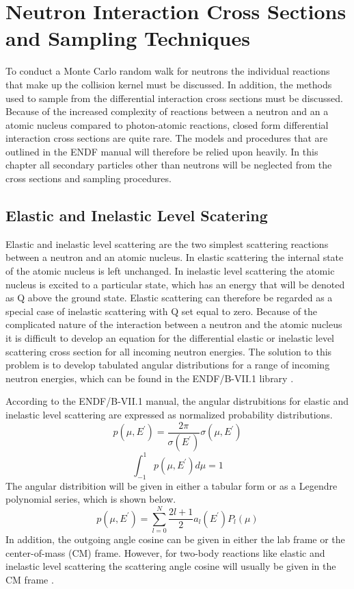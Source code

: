 \chapter{Neutron Interaction Cross Sections and Sampling Techniques}
\label{ch:neutron_ineractions}
To conduct a Monte Carlo random walk for neutrons the individual reactions that
make up the collision kernel must be discussed. In addition, the methods used
to sample from the differential interaction cross sections must be discussed.
Because of the increased complexity of reactions between a neutron and an a
atomic nucleus compared to photon-atomic reactions, closed form differential
interaction cross sections are quite rare. The models and procedures that are
outlined in the ENDF manual will therefore be relied upon heavily. In this
chapter all secondary particles other than neutrons will be neglected from the
cross sections and sampling procedures. 

\section{Elastic and Inelastic Level Scatering}
Elastic and inelastic level scattering are the two simplest scattering reactions
between a neutron and an atomic nucleus. In elastic scattering the internal 
state of the atomic nucleus is left unchanged. In inelastic level scattering 
the atomic nucleus is excited to a particular state, which has an energy that 
will be denoted as Q above the ground state. Elastic scattering can therefore 
be regarded as a special case of inelastic scattering with Q set equal to zero.
Because of the complicated nature of the interaction between a neutron and the
atomic nucleus it is difficult to develop an equation for the differential
elastic or inelastic level scattering cross section for all incoming neutron 
energies. The solution to this problem is to develop tabulated angular 
distributions for a range of incoming neutron energies, which can be found in 
the ENDF/B-VII.1 library \citep{chadwick_endf/b-vii.1_2011}. 

According to the ENDF/B-VII.1 manual, the angular distrubitions for elastic and 
inelastic level scattering are expressed as normalized probability 
distributions.
\begin{equation}
  p(\mu,E^{'}) = \frac{2\pi}{\sigma(E^{'})}\sigma(\mu,E^{'})
\end{equation}
\begin{equation}
  \int_{-1}^1p(\mu,E^{'})d\mu=1
\end{equation}
The angular distribition will be given in either a tabular form or as a 
Legendre polynomial series, which is shown below.
\begin{equation}
  p(\mu,E^{'}) = \sum_{l=0}^N\frac{2l+1}{2}a_l(E^{'})P_l(\mu)
\end{equation}
In addition, the outgoing angle cosine can be given in either the lab frame or
the center-of-mass (CM) frame. However, for two-body reactions like elastic and 
inelastic level scattering the scattering angle cosine will usually be given in 
the CM frame \citep{chadwick_endf/b-vii.1_2011}. 

